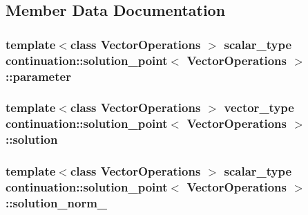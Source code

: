 \subsection{Member Data Documentation}
\hypertarget{classcontinuation_1_1solution__point_ab5c24bf3e77b6ad2128fb0829954003f}{
\subsubsection[{parameter}]{\setlength{\rightskip}{0pt plus 5cm}template$<$class Vector\-Operations $>$ {\bf scalar\-\_\-type} {\bf continuation\-::solution\-\_\-point}$<$ Vector\-Operations $>$\-::parameter\hspace{0.3cm}{\ttfamily [protected]}}}\label{classcontinuation_1_1solution__point_ab5c24bf3e77b6ad2128fb0829954003f}
\hypertarget{classcontinuation_1_1solution__point_a931d91bfd44bb22ca33adb05a53cd660}{
\subsubsection[{solution}]{\setlength{\rightskip}{0pt plus 5cm}template$<$class Vector\-Operations $>$ {\bf vector\-\_\-type} {\bf continuation\-::solution\-\_\-point}$<$ Vector\-Operations $>$\-::solution\hspace{0.3cm}{\ttfamily [protected]}}}\label{classcontinuation_1_1solution__point_a931d91bfd44bb22ca33adb05a53cd660}
\hypertarget{classcontinuation_1_1solution__point_a553c396c3e822fadec812e5add4d9580}{
\subsubsection[{solution\-\_\-norm\-\_\-1}]{\setlength{\rightskip}{0pt plus 5cm}template$<$class Vector\-Operations $>$ {\bf scalar\-\_\-type} {\bf continuation\-::solution\-\_\-point}$<$ Vector\-Operations $>$\-::solution\-\_\-norm\-\_\hspace{0.3cm}{\ttfamily [protected]}}}\label{classcontinuation_1_1solution__point_a553c396c3e822fadec812e5add4d9580}
